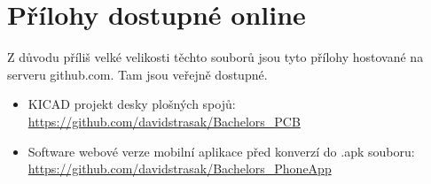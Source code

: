 \section*{Přílohy dostupné online}
Z důvodu příliš velké velikosti těchto souborů jsou tyto přílohy hostované na serveru github.com. Tam jsou veřejně dostupné.
\begin{itemize}
	\item KICAD projekt desky plošných spojů: \url{https://github.com/davidstrasak/Bachelors_PCB}
	\item Software webové verze mobilní aplikace před konverzí do .apk souboru: \url{https://github.com/davidstrasak/Bachelors_PhoneApp}
\end{itemize}















